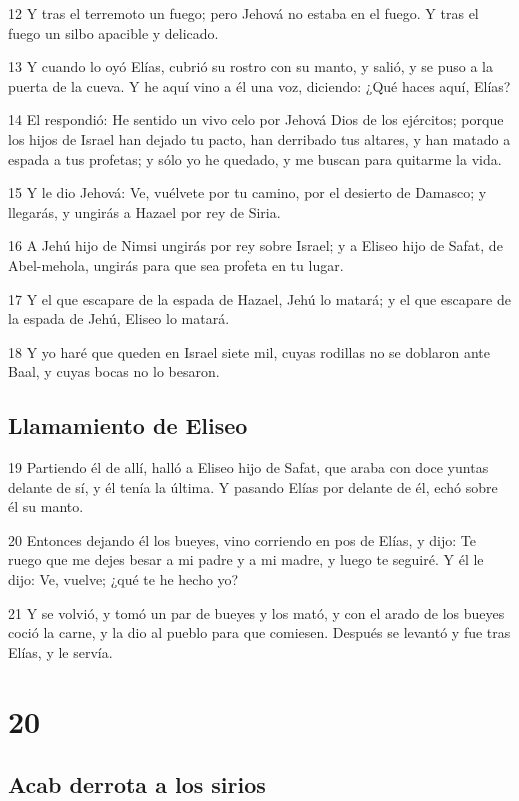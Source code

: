 \par 12 Y tras el terremoto un fuego; pero Jehová no estaba en el fuego. Y tras el fuego un silbo apacible y delicado.
\par 13 Y cuando lo oyó Elías, cubrió su rostro con su manto, y salió, y se puso a la puerta de la cueva. Y he aquí vino a él una voz, diciendo: ¿Qué haces aquí, Elías?
\par 14 El respondió: He sentido un vivo celo por Jehová Dios de los ejércitos; porque los hijos de Israel han dejado tu pacto, han derribado tus altares, y han matado a espada a tus profetas; y sólo yo he quedado, y me buscan para quitarme la vida. 
\par 15 Y le dio Jehová: Ve, vuélvete por tu camino, por el desierto de Damasco; y llegarás, y ungirás a Hazael por rey de Siria. 
\par 16 A Jehú hijo de Nimsi ungirás por rey sobre Israel; y a Eliseo hijo de Safat, de Abel-mehola, ungirás para que sea profeta en tu lugar.
\par 17 Y el que escapare de la espada de Hazael, Jehú lo matará; y el que escapare de la espada de Jehú, Eliseo lo matará.
\par 18 Y yo haré que queden en Israel siete mil, cuyas rodillas no se doblaron ante Baal, y cuyas bocas no lo besaron.

\section*{Llamamiento de Eliseo}

\par 19 Partiendo él de allí, halló a Eliseo hijo de Safat, que araba con doce yuntas delante de sí, y él tenía la última. Y pasando Elías por delante de él, echó sobre él su manto.
\par 20 Entonces dejando él los bueyes, vino corriendo en pos de Elías, y dijo: Te ruego que me dejes besar a mi padre y a mi madre, y luego te seguiré. Y él le dijo: Ve, vuelve; ¿qué te he hecho yo?
\par 21 Y se volvió, y tomó un par de bueyes y los mató, y con el arado de los bueyes coció la carne, y la dio al pueblo para que comiesen. Después se levantó y fue tras Elías, y le servía.

\chapter{20}

\section*{Acab derrota a los sirios }

